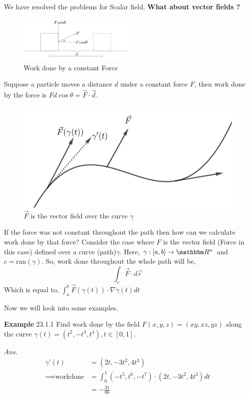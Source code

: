 \documentclass[../Analysis-3]{subfiles}
\begin{document}
We have resolved the problems for Scalar field.\textbf{ What about vector fields ?}
\begin{figure}[H]
    \centering
    \includegraphics[width=0.5\textwidth]{../figures/lec-23.2.png}
    \caption{Work done by a constant Force}
\end{figure}
Suppose a particle moves a distance $d$ under a constant force $F$, then work done by the force is $Fd\cos{\theta} = \vec{F}\cdot\vec{d}$.


\begin{figure}
    \centering
    \includegraphics[width=.98\linewidth]{../figures/lec-23.3.png}
    \caption{$\vec{F}$ is the vector field over the curve $\gamma$}
\end{figure}

If the force was not constant throughout the path then how can we calculate work done by that force?
Consider the case where $F$ is the vector field (Force in this case) defined over a curve (path)$\gamma$. Here, $\gamma : [a,b] \to \R^n$ and $c = \text{ran}(\gamma)$. So, work done throughout the whole path will be,
\[\int_c \vec{F}\cdot d\vec{r}\]
Which is equal to, $\int_a^b \vec{F}(\gamma(t))\cdot \nabla \gamma(t) dt$

Now we will look into some examples.
\vspace{0.3cm}

\textbf{Example} 23.1.1  Find work done by the field $F(x,y,z) = (xy,xz,yz)$ along the curve $\gamma(t) = (t^2,-t^3,t^4),t \in [0,1]$.

\textit{Ans.} \begin{align*}
    \gamma'(t)               & = (2t,-3t^2,4t^3)                                 \\
    \implies \text{workdone} & = \int_0^1 (-t^5,t^6,-t^7)\cdot(2t,-3t^2,4t^3) dt \\
                             & = -\frac{31}{88}
\end{align*}
\end{document}
